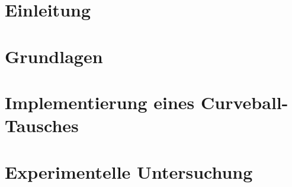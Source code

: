\documentclass[a4paper, 11pt]{scrbook}
\theoremstyle{plain} %
\theoremstyle{definition} %
\newcommand{\ct}{Curveball-Tausch}
\begin{document}
\chapter{Einleitung}






\chapter{Grundlagen}








\chapter{Implementierung eines \ct{es} }





\chapter{Experimentelle Untersuchung}



\end{document}
